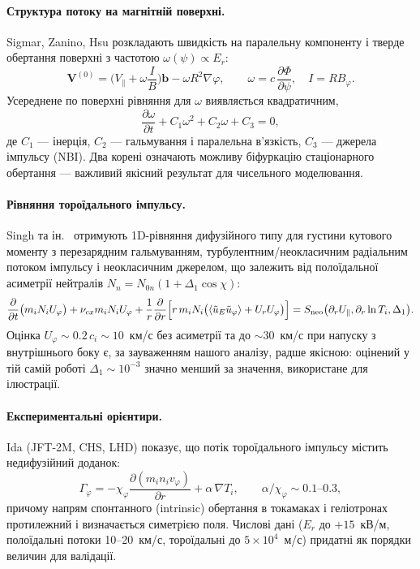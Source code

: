 \documentclass[11pt,a4paper]{article}
\begin{document}
\paragraph{Структура потоку на магнітній поверхні.} Sigmar, Zanino, Hsu
\cite{Sigmar1987} розкладають швидкість на паралельну компоненту і тверде обертання
поверхні з частотою $\omega(\psi)\propto E_r$:
\begin{equation}\label{eq:V0}
  \mathbf V^{(0)}=\Big(V_\parallel+\omega\frac{I}{B}\Big)\mathbf b-\omega R^2\nabla\varphi,
  \qquad \omega=c\,\frac{\partial\Phi}{\partial\psi},\quad I=RB_\varphi .
\end{equation}
Усереднене по поверхні рівняння для $\omega$ виявляється квадратичним,
\begin{equation}\label{eq:omega}
  \frac{\partial\omega}{\partial t}+C_1\omega^2+C_2\omega+C_3=0,
\end{equation}
де $C_1$ --- інерція, $C_2$ --- гальмування і паралельна в'язкість, $C_3$ ---
джерела імпульсу (NBI). Два корені означають можливу біфуркацію стаціонарного
обертання --- важливий якісний результат для чисельного моделювання.

\paragraph{Рівняння тороїдального імпульсу.} Singh та ін.\ \cite{Singh2004}
отримують 1D-рівняння дифузійного типу для густини кутового моменту з
перезарядним гальмуванням, турбулентним/неокласичним радіальним потоком імпульсу
і неокласичним джерелом, що залежить від полоїдальної асиметрії нейтралів
$N_n=N_{0n}(1+\Delta_1\cos\chi)$:
\begin{equation}\label{eq:mom}
  \frac{\partial}{\partial t}\big(m_iN_iU_{\varphi}\big)+\nu_{cx}m_iN_iU_{\varphi}
  +\frac{1}{r}\frac{\partial}{\partial r}\Big[r\,m_iN_i\big(\langle\tilde u_E\tilde u_{\varphi}\rangle+U_rU_{\varphi}\big)\Big]
  =S_{\rm neo}\big(\partial_rU_\parallel,\partial_r\ln T_i,\Delta_1\big).
\end{equation}
Оцінка $U_\varphi\sim0.2\,c_i\sim10$~км/с без асиметрії та до $\sim30$~км/с при
напуску з внутрішнього боку є, за зауваженням нашого аналізу, радше якісною: оцінений
у тій самій роботі $\Delta_1\sim10^{-3}$ значно менший за значення, використане для
ілюстрації.

\paragraph{Експериментальні орієнтири.} Ida \cite{Ida2001} (JFT-2M, CHS, LHD)
показує, що потік тороїдального імпульсу містить недифузійний доданок:
\begin{equation}\label{eq:Gamma}
  \Gamma_\varphi=-\chi_\varphi\frac{\partial(m_in_iv_\varphi)}{\partial r}+\alpha\,\nabla T_i,
  \qquad \alpha/\chi_\varphi\sim0.1\text{--}0.3,
\end{equation}
причому напрям спонтанного (intrinsic) обертання в токамаках і геліотронах
протилежний і визначається симетрією поля. Числові дані ($E_r$ до $+15$~кВ/м,
полоїдальні потоки 10--20~км/с, тороїдальні до $5\times10^4$~м/с) придатні як
порядки величин для валідації.
\end{document}
